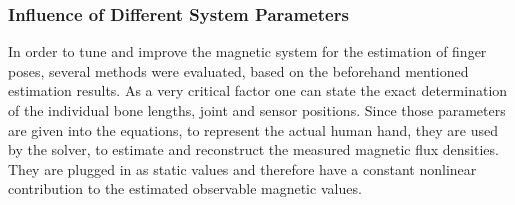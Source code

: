 
\FloatBarrier	
\subsubsection{Influence of Different System Parameters}

In order to tune and improve the magnetic system for the estimation of finger poses, several methods were evaluated, based on the beforehand mentioned estimation results. As a very critical factor one can state the exact determination of the individual bone lengths, joint and sensor positions. Since those parameters are given into the equations, to represent the actual human hand, they are used by the solver, to estimate and reconstruct the measured magnetic flux densities. They are plugged in as static values and therefore have a constant nonlinear contribution to the estimated observable magnetic values. 

